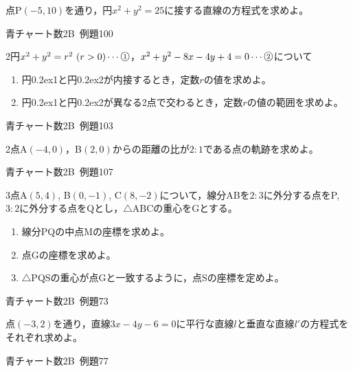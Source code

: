 \documentclass[b4paper, dvipdfmx, 11pt, fleqn, twocolumn, uplatex]{jsarticle}
\newcommand{\ctext}[1]{\raise0.2ex\hbox{\textcircled{\scriptsize{#1}}}}
\newcommand{\tria}[1]{\triangle\mathrm{#1}}
\begin{document}

\begin{screen}
点P$(-5, 10)$を通り，円$x^2+y^2=25$に接する直線の方程式を求めよ。
\begin{flushright}
    青チャート数2B~例題100
\end{flushright}
\end{screen}


\begin{screen}
2円$x^2+y^2=r^2~(r>0)\cdots\ctext{1}$，$x^2+y^2-8x-4y+4=0\cdots\ctext{2}$について
\begin{enumerate}[label={(\arabic*)}]
\item 円\ctext{1}と円\ctext{2}が内接するとき，定数$r$の値を求めよ。
\item 円\ctext{1}と円\ctext{2}が異なる2点で交わるとき，定数$r$の値の範囲を求めよ。
\end{enumerate}
\begin{flushright}
    青チャート数2B~例題103
\end{flushright}
\end{screen}


\begin{screen}
2点A$(-4, 0)$，B$(2, 0)$からの距離の比が$2:1$である点の軌跡を求めよ。
\begin{flushright}
    青チャート数2B~例題107
\end{flushright}
\end{screen}



\begin{screen}
3点A$(5, 4)$, B$(0, -1)$, C$(8, -2)$について，線分ABを$2:3$に外分する点をP, $3:2$に外分する点をQとし，$\tria{ABC}$の重心をGとする。
\begin{enumerate}[label={(\arabic*)}]
\item 線分PQの中点Mの座標を求めよ。
\item 点Gの座標を求めよ。
\item $\tria{PQS}$の重心が点Gと一致するように，点Sの座標を定めよ。
\end{enumerate}
\begin{flushright}
    青チャート数2B~例題73
\end{flushright}
\end{screen}


\begin{screen}
点$(-3,2)$を通り，直線$3x-4y-6=0$に平行な直線$l$と垂直な直線$l'$の方程式をそれぞれ求めよ。
\begin{flushright}
    青チャート数2B~例題77
\end{flushright}
\end{screen}
\end{document}
